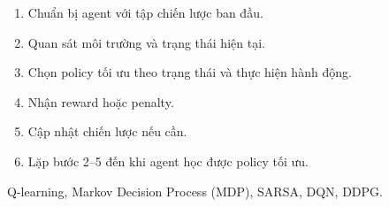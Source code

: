 \begin{phuongphap}[title={Sáu bước}]
\begin{enumerate}
  \item Chuẩn bị agent với tập chiến lược ban đầu.
  \item Quan sát môi trường và trạng thái hiện tại.
  \item Chọn policy tối ưu theo trạng thái và thực hiện hành động.
  \item Nhận reward hoặc penalty.
  \item Cập nhật chiến lược nếu cần.
  \item Lặp bước 2--5 đến khi agent học được policy tối ưu.
\end{enumerate}
\end{phuongphap}

\begin{phuongphap}[title={Thuật toán RL phổ biến}]
Q-learning, Markov Decision Process (MDP), SARSA, DQN, DDPG.
\end{phuongphap}
